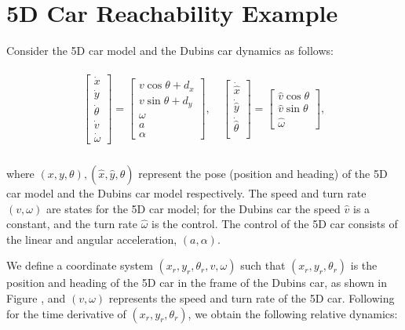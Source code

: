 \section{5D Car Reachability Example \label{sec:reach_planner}}

Consider the 5D car model and the Dubins car dynamics as follows:

\begin{equation}
\label{eq:5D_and_3D_dyn}
\begin{aligned}
\begin{array}{c}
\left[
\begin{array}{c}
\dot x\\
\dot y\\
\dot\theta\\
\dot v\\
\dot \omega
\end{array}
\right]
=
\left[
\begin{array}{c}
v \cos \theta + d_x\\
v \sin \theta + d_y\\
\omega \\
a\\
\alpha
\end{array}
\right], \quad
\left[
\begin{array}{c}
\dot \hat x\\
\dot \hat y\\
\dot \hat \theta\\
\end{array}
\right] 
=
\left[
\begin{array}{c}
\hat v \cos \theta\\
\hat v \sin \theta\\
\hat \omega
\end{array}
\right],
\end{array}\\
\end{aligned}
\end{equation}

\noindent where $(x,y,\theta),(\hat x, \hat y, \hat\theta)$ represent the pose (position and heading) of the 5D car model and the Dubins car model respectively. The speed and turn rate $(v, \omega)$ are states for the 5D car model; for the Dubins car the speed $\hat v$ is a constant, and the turn rate $\hat \omega$ is the control. The control of the 5D car consists of the linear and angular acceleration, $(a, \alpha)$.

We define a coordinate system $(x_r, y_r, \theta_r, v, \omega)$ such that $(x_r, y_r, \theta_r)$ is the position and heading of the 5D car in the frame of the Dubins car, as shown in Figure \cite{}, and $(v, \omega)$ represents the speed and turn rate of the 5D car. Following \cite{Mitchell05} for the time derivative of $(x_r, y_r, \theta_r)$, we obtain the following relative dynamics:

